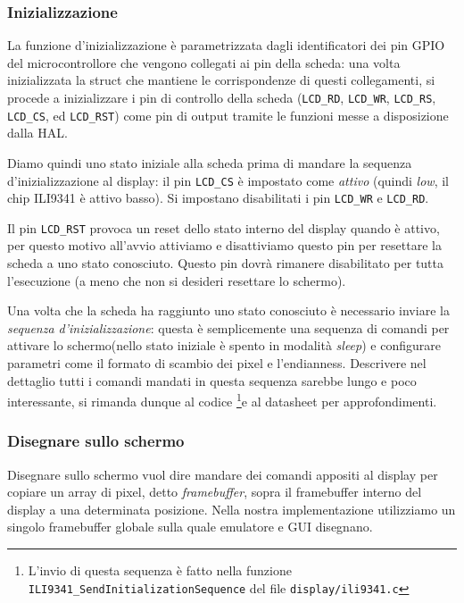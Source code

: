\documentclass[hidelinks,12pt]{article}
\begin{document}
\subsubsection{Inizializzazione}
La funzione d'inizializzazione è parametrizzata dagli identificatori dei pin
GPIO del microcontrollore che vengono collegati ai pin della scheda: una volta
inizializzata la struct che mantiene le corrispondenze di questi collegamenti,
si procede a inizializzare i pin di controllo della scheda (\texttt{LCD\_RD},
\texttt{LCD\_WR}, \texttt{LCD\_RS}, \texttt{LCD\_CS}, ed \texttt{LCD\_RST}) come
pin di output tramite le funzioni messe a disposizione dalla HAL.

Diamo quindi uno stato iniziale alla scheda prima di mandare la sequenza
d'inizializzazione al display:
il pin \texttt{LCD\_CS} è impostato come \textit{attivo} (quindi \textit{low},
il chip ILI9341 è attivo basso).
Si impostano disabilitati i pin \texttt{LCD\_WR} e \texttt{LCD\_RD}.

Il pin \texttt{LCD\_RST} provoca un reset dello stato interno del display quando
è attivo, per questo motivo all'avvio attiviamo e disattiviamo questo pin per
resettare la scheda a uno stato conosciuto.
Questo pin dovrà rimanere disabilitato per tutta l'esecuzione
(a meno che non si desideri resettare lo schermo).

Una volta che la scheda ha raggiunto uno stato conosciuto è necessario inviare
la \textit{sequenza d'inizializzazione}: questa è semplicemente una sequenza
di comandi per attivare lo schermo(nello stato iniziale è spento in
modalità \textit{sleep}) e configurare parametri come il formato di scambio
dei pixel e l'endianness.
Descrivere nel dettaglio tutti i comandi mandati in questa sequenza sarebbe
lungo e poco interessante, si rimanda dunque al codice \footnote{
	L'invio di questa sequenza è fatto nella funzione
	\texttt{ILI9341\_SendInitializationSequence} del file
	\texttt{display/ili9341.c}
}e al datasheet \cite{ili9341} per approfondimenti.

\subsubsection{Disegnare sullo schermo}
Disegnare sullo schermo vuol dire mandare dei comandi appositi al display per
copiare un array di pixel, detto \textit{framebuffer}, sopra il framebuffer
interno del display a una determinata posizione.
Nella nostra implementazione utilizziamo un singolo framebuffer globale sulla
quale emulatore e GUI disegnano.
\end{document}
